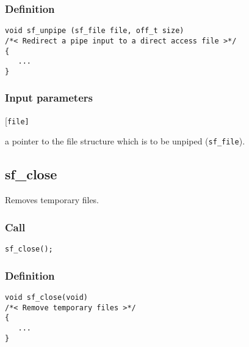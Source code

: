 \subsubsection*{Definition}
\begin{verbatim}
void sf_unpipe (sf_file file, off_t size) 
/*< Redirect a pipe input to a direct access file >*/
{
   ...
} 
\end{verbatim}

\subsubsection*{Input parameters}
\begin{desclist}{\tt }{\quad}[\tt file]
   \setlength\itemsep{0pt}
   \item[file] a pointer to the file structure which is to be unpiped (\texttt{sf\_file}).
\end{desclist}



\subsection{{sf\_close}}\label{sec:sf_close}
Removes temporary files.

\subsubsection*{Call}
\begin{verbatim}sf_close();\end{verbatim}

\subsubsection*{Definition}
\begin{verbatim}
void sf_close(void)
/*< Remove temporary files >*/
{
   ...   
}
\end{verbatim}




